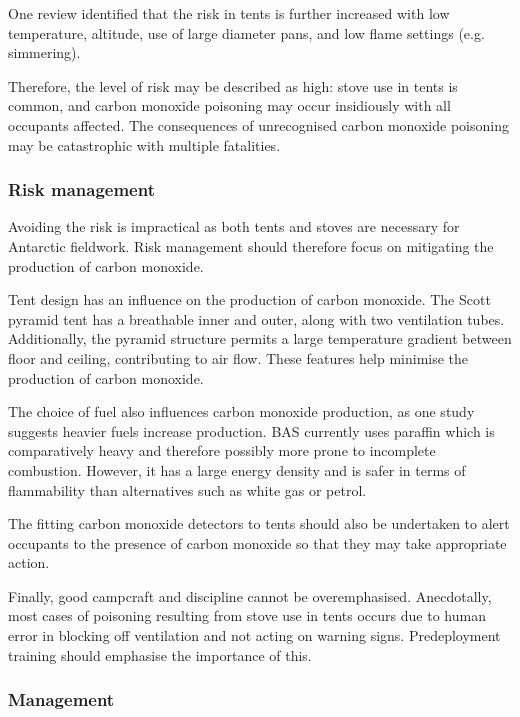 \documentclass[12pt,a4paper]{article}
\begin{document}
One review identified that the risk in tents is further increased with low temperature, altitude, use of large diameter pans, and low flame settings (e.g. simmering).\cite{LeighSmith:2004wr}

Therefore, the level of risk may be described as high: stove use in tents is common, and carbon monoxide poisoning may occur insidiously with all occupants affected. The consequences of unrecognised carbon monoxide poisoning may be catastrophic with multiple fatalities.

\subsubsection{Risk management}

Avoiding the risk is impractical as both tents and stoves are necessary for Antarctic fieldwork. Risk management should therefore focus on mitigating the production of carbon monoxide.

Tent design has an influence on the production of carbon monoxide. The Scott pyramid tent has a breathable inner and outer, along with two ventilation tubes. Additionally, the pyramid structure permits a large temperature gradient between floor and ceiling, contributing to air flow. These features help minimise the production of carbon monoxide.\cite{Betten:2013he,Anonymous:ymdxPOzf}

The choice of fuel also influences carbon monoxide production, as one study suggests heavier fuels increase production.\cite{Betten:2013he} BAS currently uses paraffin which is comparatively heavy and therefore possibly more prone to incomplete combustion. However, it has a large energy density and is safer in terms of flammability than alternatives such as white gas or petrol.

The fitting carbon monoxide detectors to tents should also be undertaken to alert occupants to the presence of carbon monoxide so that they may take appropriate action.

Finally, good campcraft and discipline cannot be overemphasised. Anecdotally, most cases of poisoning resulting from stove use in tents occurs due to human error in blocking off ventilation and not acting on warning signs.\cite{LeighSmith:2004wr} Predeployment training should emphasise the importance of this.

\subsubsection{Management}
\end{document}
